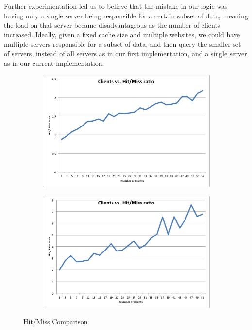 \documentclass[conference]{IEEEtran}
\begin{document}
Further experimentation led us to believe that the mistake in our logic was having only a single server being responsible for a certain subset of data, meaning the load on that server became disadvantageous as the number of clients increased. Ideally, given a fixed cache size and multiple websites, we could have multiple servers responsible for a subset of data, and then query the smaller set of servers, instead of all servers as in our first implementation, and a single server as in our current implementation. 

\begin{figure}[!h]
	\centering
	\begin{subfigure}[b]{0.49\columnwidth}
		\centering
		\includegraphics[width=\columnwidth]{figures/hit_miss.png}
	\end{subfigure}
	\begin{subfigure}[b]{0.49\columnwidth}
		\centering
		\includegraphics[width=\columnwidth]{figures/hit_miss_1.png}
	\end{subfigure}
	\caption{Hit/Miss Comparison}
\end{figure}
\end{document}
